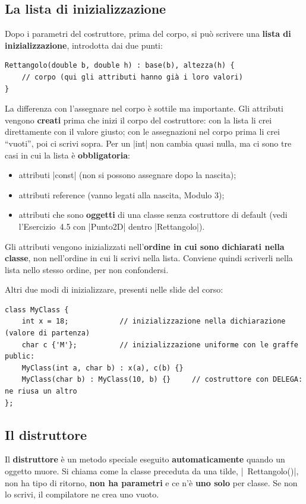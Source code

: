 \subsection*{La lista di inizializzazione}

Dopo i parametri del costruttore, prima del corpo, si può scrivere una
\textbf{lista di inizializzazione}, introdotta dai due punti:
\begin{lstlisting}
Rettangolo(double b, double h) : base(b), altezza(h) {
    // corpo (qui gli attributi hanno già i loro valori)
}
\end{lstlisting}
La differenza con l'assegnare nel corpo è sottile ma importante. Gli attributi
vengono \textbf{creati} prima che inizi il corpo del costruttore: con la lista li
crei direttamente con il valore giusto; con le assegnazioni nel corpo prima li crei
``vuoti'', poi ci scrivi sopra. Per un \cc|int| non cambia quasi nulla, ma ci sono
tre casi in cui la lista è \textbf{obbligatoria}:
\begin{itemize}
  \item attributi \cc|const| (non si possono assegnare dopo la nascita);
  \item attributi reference (vanno legati alla nascita, Modulo 3);
  \item attributi che sono \textbf{oggetti} di una classe senza costruttore di
        default (vedi l'Esercizio~4.5 con \cc|Punto2D| dentro \cc|Rettangolo|).
\end{itemize}
Gli attributi vengono inizializzati nell'\textbf{ordine in cui sono dichiarati
nella classe}, non nell'ordine in cui li scrivi nella lista. Conviene quindi
scriverli nella lista nello stesso ordine, per non confondersi.

Altri due modi di inizializzare, presenti nelle slide del corso:
\begin{lstlisting}
class MyClass {
    int x = 18;            // inizializzazione nella dichiarazione (valore di partenza)
    char c {'M'};          // inizializzazione uniforme con le graffe
public:
    MyClass(int a, char b) : x(a), c(b) {}
    MyClass(char b) : MyClass(10, b) {}     // costruttore con DELEGA: ne riusa un altro
};
\end{lstlisting}

\subsection*{Il distruttore}

\begin{definizione}[: distruttore]
Il \textbf{distruttore} è un metodo speciale eseguito \textbf{automaticamente}
quando un oggetto muore. Si chiama come la classe preceduta da una tilde,
\cc|~Rettangolo()|, non ha tipo di ritorno, \textbf{non ha parametri} e ce n'è
\textbf{uno solo} per classe. Se non lo scrivi, il compilatore ne crea uno vuoto.
\end{definizione}

